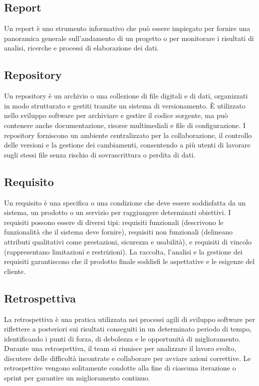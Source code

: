 \vspace{2em}
\subsection*{Report}
\par Un report è uno strumento informativo che può essere impiegato per fornire una panoramica generale sull’andamento di un progetto o per monitorare i risultati di analisi, ricerche e processi di elaborazione dei dati.

\vspace{2em}
\subsection*{Repository}
\par Un repository è un archivio o una collezione di file digitali e di dati, organizzati in modo strutturato e gestiti tramite un sistema di versionamento. È utilizzato nello sviluppo software per archiviare e gestire il codice sorgente, ma può contenere anche documentazione, risorse multimediali e file di configurazione. I repository forniscono un ambiente centralizzato per la collaborazione, il controllo delle versioni e la gestione dei cambiamenti, consentendo a più utenti di lavorare sugli stessi file senza rischio di sovrascrittura o perdita di dati.

\vspace{2em}
\subsection*{Requisito}
\par Un requisito è una specifica o una condizione che deve essere soddisfatta da un sistema, un prodotto o un servizio per raggiungere determinati obiettivi. I requisiti possono essere di diversi tipi: requisiti funzionali (descrivono le funzionalità che il sistema deve fornire), requisiti non funzionali (delineano attributi qualitativi come prestazioni, sicurezza e usabilità), e requisiti di vincolo (rappresentano limitazioni e restrizioni). La raccolta, l'analisi e la gestione dei requisiti garantiscono che il prodotto finale soddisfi le aspettative e le esigenze del cliente.

\vspace{2em}
\subsection*{Retrospettiva}
\par La retrospettiva è una pratica utilizzata nei processi agili di sviluppo software per riflettere a posteriori sui risultati conseguiti in un determinato periodo di tempo, identificando i punti di forza, di debolezza e le opportunità di miglioramento. Durante una retrospettiva, il team si riunisce per analizzare il lavoro svolto, discutere delle difficoltà incontrate e collaborare per avviare azioni correttive. Le retrospettive vengono solitamente condotte alla fine di ciascuna iterazione o sprint per garantire un miglioramento continuo.

